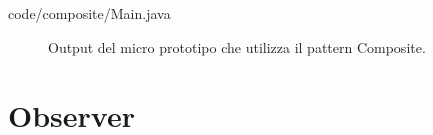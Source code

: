 \documentclass[12pt]{article}
\begin{document}

{code/composite/Main.java}

\begin{figure}[!h]
  \caption{\small Output del micro prototipo che utilizza il pattern Composite.}
  \label{fig:client_composite}
\end{figure}


\newpage
\section{Observer}
\label{appendix:observer}
\end{document}
